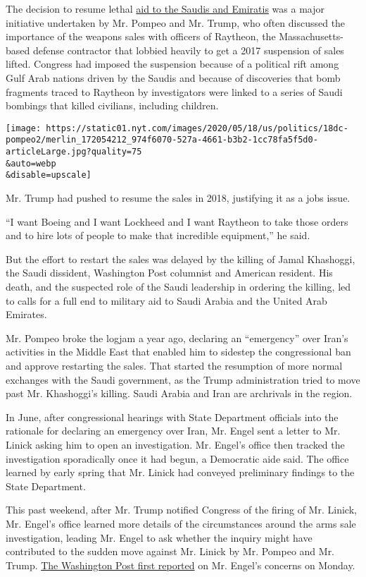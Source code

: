 The decision to resume lethal
\href{https://www.nytimes.com/2019/06/07/us/saudi-arabia-arms-sales-raytheon.html}{aid
to the Saudis and Emiratis} was a major initiative undertaken by Mr.
Pompeo and Mr. Trump, who often discussed the importance of the weapons
sales with officers of Raytheon, the Massachusetts-based defense
contractor that lobbied heavily to get a 2017 suspension of sales
lifted. Congress had imposed the suspension because of a political rift
among Gulf Arab nations driven by the Saudis and because of discoveries
that bomb fragments traced to Raytheon by investigators were linked to a
series of Saudi bombings that killed civilians, including children.

\texttt{[image: https://static01.nyt.com/images/2020/05/18/us/politics/18dc-pompeo2/merlin\_172054212\_974f6070-527a-4661-b3b2-1cc78fa5f5d0-articleLarge.jpg?quality=75\\\&auto=webp\\\&disable=upscale]}

Mr. Trump had pushed to resume the sales in 2018, justifying it as a
jobs issue.

``I want Boeing and I want Lockheed and I want Raytheon to take those
orders and to hire lots of people to make that incredible equipment,''
he said.

But the effort to restart the sales was delayed by the killing of Jamal
Khashoggi, the Saudi dissident, Washington Post columnist and American
resident. His death, and the suspected role of the Saudi leadership in
ordering the killing, led to calls for a full end to military aid to
Saudi Arabia and the United Arab Emirates.

Mr. Pompeo broke the logjam a year ago, declaring an ``emergency'' over
Iran's activities in the Middle East that enabled him to sidestep the
congressional ban and approve restarting the sales. That started the
resumption of more normal exchanges with the Saudi government, as the
Trump administration tried to move past Mr. Khashoggi's killing. Saudi
Arabia and Iran are archrivals in the region.

In June, after congressional hearings with State Department officials
into the rationale for declaring an emergency over Iran, Mr. Engel sent
a letter to Mr. Linick asking him to open an investigation. Mr. Engel's
office then tracked the investigation sporadically once it had begun, a
Democratic aide said. The office learned by early spring that Mr. Linick
had conveyed preliminary findings to the State Department.

This past weekend, after Mr. Trump notified Congress of the firing of
Mr. Linick, Mr. Engel's office learned more details of the circumstances
around the arms sale investigation, leading Mr. Engel to ask whether the
inquiry might have contributed to the sudden move against Mr. Linick by
Mr. Pompeo and Mr. Trump.
\href{https://www.washingtonpost.com/opinions/2020/05/18/trumps-purge-just-got-much-more-corrupt-heres-whats-coming-next/}{The
Washington Post first reported} on Mr. Engel's concerns on Monday.

